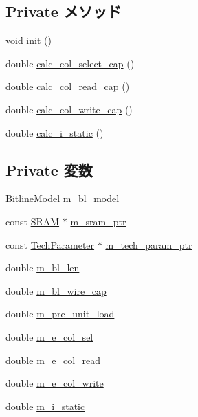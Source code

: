 \subsection*{Private メソッド}
\begin{DoxyCompactItemize}
\item 
void \hyperlink{classBitlineUnit_a02fd73d861ef2e4aabb38c0c9ff82947}{init} ()
\item 
double \hyperlink{classBitlineUnit_a52364fe6b4c48632e06db38ca40bd454}{calc\_\-col\_\-select\_\-cap} ()
\item 
double \hyperlink{classBitlineUnit_a8392bae5acfef90c8eb970571f97fa73}{calc\_\-col\_\-read\_\-cap} ()
\item 
double \hyperlink{classBitlineUnit_a0d247ef9da513a39c1c01302379f940a}{calc\_\-col\_\-write\_\-cap} ()
\item 
double \hyperlink{classBitlineUnit_a0027807356ac4ca07fe2e593234eb884}{calc\_\-i\_\-static} ()
\end{DoxyCompactItemize}
\subsection*{Private 変数}
\begin{DoxyCompactItemize}
\item 
\hyperlink{classBitlineUnit_aa621ee4b7cf946b1f26e4c1c25db771d}{BitlineModel} \hyperlink{classBitlineUnit_a577aea8feb7f44ee5622c59b3c30aa3e}{m\_\-bl\_\-model}
\item 
const \hyperlink{classSRAM}{SRAM} $\ast$ \hyperlink{classBitlineUnit_aab5dce4213ab482c5e1909bfc96d62af}{m\_\-sram\_\-ptr}
\item 
const \hyperlink{classTechParameter}{TechParameter} $\ast$ \hyperlink{classBitlineUnit_a11d1644aa2bfe0e16783dface6fadf13}{m\_\-tech\_\-param\_\-ptr}
\item 
double \hyperlink{classBitlineUnit_a573bc1ecde5b99ad29bc9be8ff8e493c}{m\_\-bl\_\-len}
\item 
double \hyperlink{classBitlineUnit_a34d4196c5def1044b66e71145047450c}{m\_\-bl\_\-wire\_\-cap}
\item 
double \hyperlink{classBitlineUnit_af90d5e539a879577375b012ce2d61642}{m\_\-pre\_\-unit\_\-load}
\item 
double \hyperlink{classBitlineUnit_aabba8cc0065ed21c1cd3528dfe2a0244}{m\_\-e\_\-col\_\-sel}
\item 
double \hyperlink{classBitlineUnit_ad8b200238f3bf9e401844aaa5f98070f}{m\_\-e\_\-col\_\-read}
\item 
double \hyperlink{classBitlineUnit_acf28bbcc91156d86dab05eac4dd7c996}{m\_\-e\_\-col\_\-write}
\item 
double \hyperlink{classBitlineUnit_a16f0c9e5942378eab4d83da3c61aba7f}{m\_\-i\_\-static}
\end{DoxyCompactItemize}


